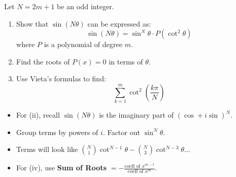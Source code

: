 \begin{problem}
Let $N = 2m+1$ be an odd integer.

\begin{enumerate}
    \item[(i)] Show that $\sin(N\theta)$ can be expressed as:
    \[ \sin(N\theta) = \sin^N\theta \cdot P(\cot^2\theta) \]
    where $P$ is a polynomial of degree $m$.
    
    \item[(ii)] Find the roots of $P(x) = 0$ in terms of $\theta$.
    
    \item[(iii)] Use Vieta's formulas to find:
    \[ \sum_{k=1}^m \cot^2\left(\frac{k\pi}{N}\right) \]
\end{enumerate}
\end{problem}

\begin{hint}
\begin{itemize}
    \item For (ii), recall $\sin(N\theta)$ is the imaginary part of $(\cos+i\sin)^N$.
    \item Group terms by powers of $i$. Factor out $\sin^N \theta$.
    \item Terms will look like $\binom{N}{1} \cot^{N-1} \theta - \binom{N}{3} \cot^{N-3} \theta \dots$
    \item For (iv), use \textbf{Sum of Roots} $= -\frac{\text{coeff of } x^{m-1}}{\text{coeff of } x^m}$.
\end{itemize}
\end{hint}









